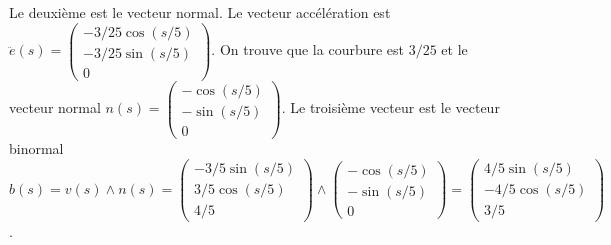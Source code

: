 {\begin{enumerate}
{ Le deuxième est le vecteur normal. Le vecteur accélération est $\ddot{e}(s)=\begin{pmatrix}-3/25\cos (s/5)\\-3/25\sin (s/5)\\0\end{pmatrix}$.
 On trouve que la courbure est $3/25$ et le vecteur normal 
 $n(s)=\begin{pmatrix}-\cos (s/5)\\-\sin (s/5)\\0\end{pmatrix}$.
 Le troisième vecteur est le vecteur binormal
 $b(s)=v(s)\wedge n(s)=\begin{pmatrix}-3/5\sin (s/5)\\3/5\cos (s/5)\\4/5\end{pmatrix}
 \wedge\begin{pmatrix}-\cos (s/5)\\-\sin (s/5)\\0\end{pmatrix}
 =\begin{pmatrix} 4/5\sin (s/5)\\-4/5 \cos (s/5)\\ 3/5\end{pmatrix}$.}
\end{enumerate}
}
